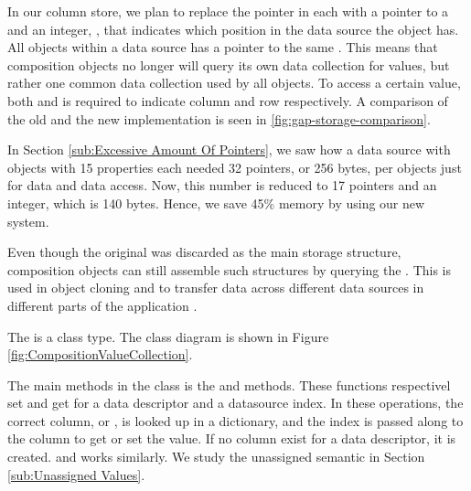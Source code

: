 In our column store, we plan to replace the  pointer in each  with a pointer to a  and an integer, , that indicates which position in the data source the object has. All objects within a data source has a pointer to the same . This means that composition objects no longer will query its own data collection for values, but rather one common data collection used by all objects. To access a certain value, both  and  is required to indicate column and row respectively. A comparison of the old and the new implementation is seen in \ref{fig:gap-storage-comparison}.

In Section \ref{sub:Excessive Amount Of Pointers}, we saw how a data source with objects with 15 properties each needed 32 pointers, or 256 bytes, per objects just for data and data access. Now, this number is reduced to 17 pointers and an integer, which is 140 bytes. Hence, we save 45\% memory by using our new system.

Even though the original  was discarded as the main storage structure, composition objects can still assemble such structures by querying the . This is used in object cloning and to transfer data across different data sources in different parts of the application .

The  is a class type. The class diagram is shown in Figure \ref{fig:CompositionValueCollection}.

The main methods in the  class is the  and  methods. These functions respectivel set and get  for a data descriptor and a datasource index. In these operations, the correct column, or , is looked up in a dictionary, and the index is passed along to the column to get or set the value. If no column exist for a data descriptor, it is created.  and  works similarly. We study the unassigned semantic in Section \ref{sub:Unassigned Values}. 

